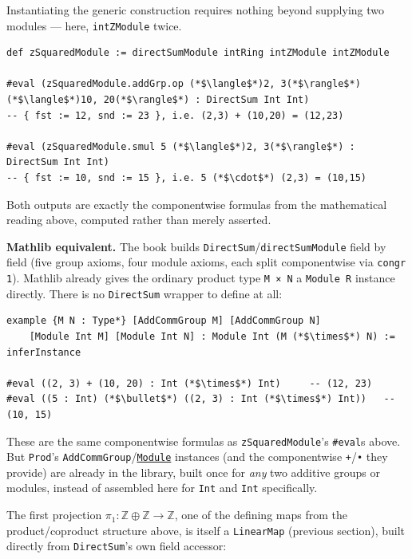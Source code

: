 Instantiating the generic construction requires nothing beyond supplying two modules --- here, \texttt{intZModule} twice.

\begin{lstlisting}
def zSquaredModule := directSumModule intRing intZModule intZModule

#eval (zSquaredModule.addGrp.op (*$\langle$*)2, 3(*$\rangle$*) (*$\langle$*)10, 20(*$\rangle$*) : DirectSum Int Int)
-- { fst := 12, snd := 23 }, i.e. (2,3) + (10,20) = (12,23)

#eval (zSquaredModule.smul 5 (*$\langle$*)2, 3(*$\rangle$*) : DirectSum Int Int)
-- { fst := 10, snd := 15 }, i.e. 5 (*$\cdot$*) (2,3) = (10,15)
\end{lstlisting}

Both outputs are exactly the componentwise formulas from the mathematical reading above, computed rather than merely asserted.

\textbf{Mathlib equivalent.} The book builds \texttt{DirectSum}/\texttt{directSumModule} field by field (five group axioms, four module axioms, each split componentwise via \texttt{congr 1}). Mathlib already gives the ordinary product type \texttt{M × N} a \texttt{Module R} instance directly. There is no \texttt{DirectSum} wrapper to define at all:

\begin{lstlisting}
example {M N : Type*} [AddCommGroup M] [AddCommGroup N]
    [Module Int M] [Module Int N] : Module Int (M (*$\times$*) N) := inferInstance

#eval ((2, 3) + (10, 20) : Int (*$\times$*) Int)     -- (12, 23)
#eval ((5 : Int) (*$\bullet$*) ((2, 3) : Int (*$\times$*) Int))   -- (10, 15)
\end{lstlisting}

These are the same componentwise formulas as \texttt{zSquaredModule}'s \texttt{\#eval}s above. But \texttt{Prod}'s \texttt{AddCommGroup}/\href{https://loogle.lean-lang.org/?q=Module}{\texttt{Module}} instances (and the componentwise \texttt{+}/\texttt{•} they provide) are already in the library, built once for \emph{any} two additive groups or modules, instead of assembled here for \texttt{Int} and \texttt{Int} specifically.

The first projection \(\pi_1 : \mathbb{Z}\oplus\mathbb{Z} \to \mathbb{Z}\), one of the defining maps from the product/coproduct structure above, is itself a \texttt{LinearMap} (previous section), built directly from \texttt{DirectSum}'s own field accessor:

